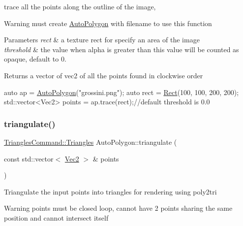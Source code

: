 trace all the points along the outline of the image, \begin{DoxyWarning}{Warning}
must create \hyperlink{classAutoPolygon}{Auto\+Polygon} with filename to use this function 
\end{DoxyWarning}

\begin{DoxyParams}{Parameters}
{\em rect} & a texture rect for specify an area of the image \\
\hline
{\em threshold} & the value when alpha is greater than this value will be counted as opaque, default to 0. \\
\hline
\end{DoxyParams}
\begin{DoxyReturn}{Returns}
a vector of vec2 of all the points found in clockwise order 
\begin{DoxyCode}
\textcolor{keyword}{auto} ap = \hyperlink{group____2d_gaa74351ac8f735344958e7b2ac8363bb5}{AutoPolygon}(\textcolor{stringliteral}{"grossini.png"});
\textcolor{keyword}{auto} rect = \hyperlink{classRect}{Rect}(100, 100, 200, 200);
std::vector<Vec2> points = ap.trace(rect);\textcolor{comment}{//default threshold is 0.0}
\end{DoxyCode}
 
\end{DoxyReturn}
\mbox{\label{group____2d_ga0ee3e7e22fdf9982ec084191928caffa}} 
\subsubsection{\texorpdfstring{triangulate()}{triangulate()}}
{\footnotesize\ttfamily \hyperlink{structTrianglesCommand_1_1Triangles}{Triangles\+Command\+::\+Triangles} Auto\+Polygon\+::triangulate (\begin{DoxyParamCaption}\item[{const std\+::vector$<$ \hyperlink{classVec2}{Vec2} $>$ \&}]{points }\end{DoxyParamCaption})}

Triangulate the input points into triangles for rendering using poly2tri \begin{DoxyWarning}{Warning}
points must be closed loop, cannot have 2 points sharing the same position and cannot intersect itself 
\end{DoxyWarning}

